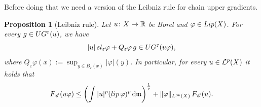 \documentclass[12pt]{amsart}
\newcommand{\R}{\mathbb{R}}
\renewcommand{\d}{{\mathrm d}}
\newcommand{\X}{{\rm X}}
\newcommand{\lip}{{\rm lip}}
\newcommand{\mm}{\mathfrak m}
\newcommand{\F}{{\rm F}}
\newtheorem{proposition}[theorem]{Proposition}
\theoremstyle{definition}
\newcommand{\Chain}[1]{\mathscr{C}^{#1}}
\renewcommand{\F}[1]{{\rm F}_{{\rm #1}}}
\begin{document}
Before doing that we need a version of the Leibniz rule for chain upper gradients.
\begin{proposition}[Leibniz rule]
\label{prop:Leibniz-rule-chains}
    Let $u\colon \X \to \R$ be Borel and $\varphi \in {\rm Lip}(\X)$.
    For every $g \in {\rm UG}^\varepsilon(u)$, we have
    \begin{equation}
    \label{eq:varepsilon_upper_gradient_Leibniz}
        \vert u \vert\, {\rm sl}_\varepsilon \varphi + Q_\varepsilon \varphi\, g \in {\rm UG}^\varepsilon(u \varphi),
    \end{equation}
    where $Q_\varepsilon\varphi(x):= \sup_{y\in \overline{B}_\varepsilon(x)} \vert \varphi \vert(y)$. In particular, for every $u \in \mathcal{L}^p(\X)$ it holds that
    \begin{equation}
    \label{eq:Leibniz_rule}
        \F{\Chain{}}(u\varphi) \le \left( \int |u|^p (\lip\,\varphi)^p \,\d \mm \right)^{\frac{1}{p}} + \|\varphi\|_{L^\infty(\X)}\, \F{\Chain{}}(u).
    \end{equation}

    
\end{proposition}
%
\end{document}
